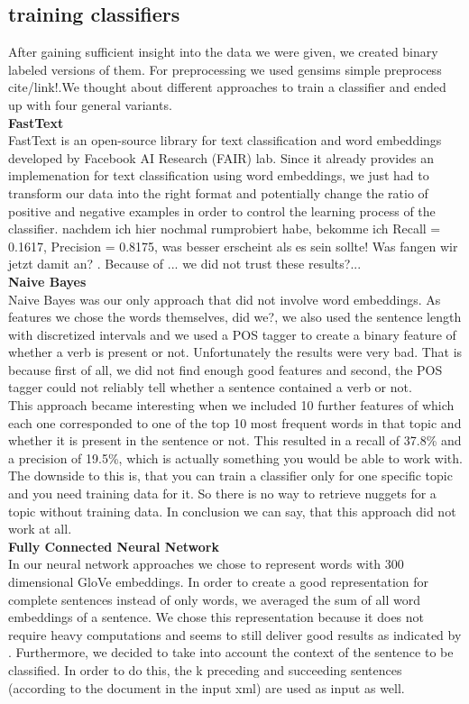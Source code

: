 \subsection{training classifiers}
After gaining sufficient insight into the data we were given, we created binary labeled versions of them. For preprocessing we used gensims simple preprocess \lbrack cite/link!\rbrack .We thought about different approaches to train a classifier and ended up with four general variants.\\
\textbf{FastText}\\
FastText \cite{joulin2016bag} is an open-source library for text classification and word embeddings developed by Facebook AI Research (FAIR) lab. Since it already provides an implemenation for text classification using word embeddings, we just had to transform our data into the right format and potentially change the ratio of positive and negative examples in order to control the learning process of the classifier. \lbrack nachdem ich hier nochmal rumprobiert habe, bekomme ich Recall = 0.1617, Precision = 0.8175, was besser erscheint als es sein sollte! Was fangen wir jetzt damit an? \rbrack. Because of ... we did not trust these results?... \\
\textbf{Naive Bayes}\\
Naive Bayes was our only approach that did not involve word embeddings. As features we chose the words themselves, \lbrack did we?\rbrack , we also used the sentence length with discretized intervals and we used a POS tagger to create a binary feature of whether a verb is present or not. Unfortunately the results were very bad. That is because first of all, we did not find enough good features and second, the POS tagger could not reliably tell whether a sentence contained a verb or not.\\
This approach became interesting when we included 10 further features of which each one corresponded to one of the top 10 most frequent words in that topic and whether it is present in the sentence or not. This resulted in a recall of 37.8\% and a precision of 19.5\%, which is actually something you would be able to work with. The downside to this is, that you can train a classifier only for one specific topic and you need training data for it. So there is no way to retrieve nuggets for a topic without training data. In conclusion we can say, that this approach did not work at all.\\
\textbf{Fully Connected Neural Network}\\
In our neural network approaches we chose to represent words with 300 dimensional GloVe embeddings. In order to create a good representation for complete sentences instead of only words, we averaged the sum of all word embeddings of a sentence. We chose this representation because it does not require heavy computations and seems to still deliver good results as indicated by \cite{iyyer2015deep}. Furthermore, we decided to take into account the context of the sentence to be classified. In order to do this, the k preceding and succeeding sentences (according to the document in the input xml) are used as input as well.\\

